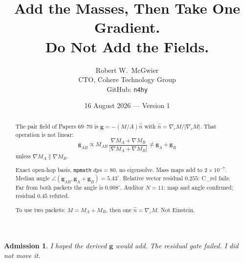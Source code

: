 \documentclass[11pt]{article}
\title{\textbf{Add the Masses, Then Take One Gradient.\\
Do Not Add the Fields.}}
\author{Robert W.\ McGwier\\
\small CTO, Cohere Technology Group\\
\small GitHub: \texttt{n4hy}}
\date{16 August 2026 --- Version 1}
\newtheorem*{admission}{Admission}
\begin{document}
\maketitle

\begin{abstract}
\noindent
The pair field of Papers 69--70 is
$\mathbf g=-(M/A)\hat n$ with
$\hat n=\nabla_c M/\lvert\nabla_c M\rvert$.
That operation is not linear:
\[
\mathbf g_{AB}\propto M_{AB}\,
\frac{\nabla M_A+\nabla M_B}{\lvert\nabla M_A+\nabla M_B\rvert}
\neq
\mathbf g_A+\mathbf g_B
\]
unless $\nabla M_A\parallel\nabla M_B$.

Exact open-hop basis, \texttt{mpmath} $dps=80$,
no eigensolve. Mass maps add to
$2\times 10^{-7}$. Median angle
$\angle(\mathbf g_{AB},\mathbf g_A+\mathbf g_B)=5.43^\circ$.
Relative vector residual $0.255$: C\_rel fails.
Far from both packets the angle is $0.008^\circ$.
Auditor $N=11$: map and angle confirmed; residual
$0.45$ refuted.

To use two packets: $M=M_A+M_B$, then one
$\hat n=\nabla_c M$. Not Einstein.
\end{abstract}

\begin{admission}
I hoped the derived $\mathbf g$ would add.
The residual gate failed. I did not move it.
\end{admission}
\end{document}
